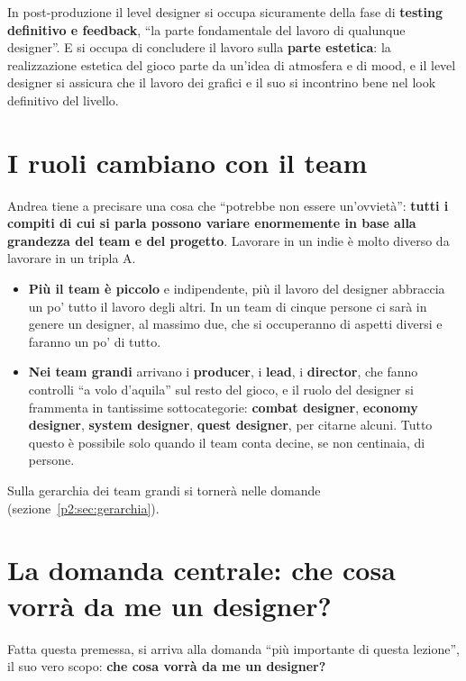 In post-produzione il level designer si occupa sicuramente della fase di
\textbf{testing definitivo e feedback}, ``la parte fondamentale del lavoro di
qualunque designer''. E si occupa di concludere il lavoro sulla
\textbf{parte estetica}: la realizzazione estetica del gioco parte da
un'idea di atmosfera e di mood, e il level designer si assicura che il
lavoro dei grafici e il suo si incontrino bene nel look definitivo del
livello.

\section{I ruoli cambiano con il team}
\label{p2:sec:team}

Andrea tiene a precisare una cosa che ``potrebbe non essere un'ovvietà'':
\textbf{tutti i compiti di cui si parla possono variare enormemente in base
alla grandezza del team e del progetto}. Lavorare in un indie è molto
diverso da lavorare in un tripla A.
\begin{itemize}
  \item \textbf{Più il team è piccolo} e indipendente, più il lavoro del
        designer abbraccia un po' tutto il lavoro degli altri. In un team di
        cinque persone ci sarà in genere un designer, al massimo due, che si
        occuperanno di aspetti diversi e faranno un po' di tutto.
  \item \textbf{Nei team grandi} arrivano i \textbf{producer}, i
        \textbf{lead}, i \textbf{director}, che fanno controlli ``a volo
        d'aquila'' sul resto del gioco, e il ruolo del designer si
        frammenta in tantissime sottocategorie: \textbf{combat designer},
        \textbf{economy designer}, \textbf{system designer}, \textbf{quest
        designer}, per citarne alcuni. Tutto questo è possibile solo quando
        il team conta decine, se non centinaia, di persone.
\end{itemize}
Sulla gerarchia dei team grandi si tornerà nelle domande
(sezione~\ref{p2:sec:gerarchia}).

\section{La domanda centrale: che cosa vorrà da me un designer?}
\label{p2:sec:vorra}

Fatta questa premessa, si arriva alla domanda ``più importante di questa
lezione'', il suo vero scopo: \textbf{che cosa vorrà da me un designer?}

